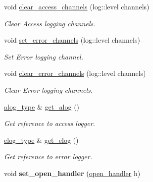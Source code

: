 \begin{DoxyCompactItemize}
void \mbox{\hyperlink{classwebsocketpp_1_1endpoint_a3fe357b3c6434273a9965eb52902575d}{clear\+\_\+access\+\_\+channels}} (log\+::level channels)
\begin{DoxyCompactList}\small\item\em Clear Access logging channels. \end{DoxyCompactList}\item 
void \mbox{\hyperlink{classwebsocketpp_1_1endpoint_a8292bcdca9344b57af1b0964ff7fc778}{set\+\_\+error\+\_\+channels}} (log\+::level channels)
\begin{DoxyCompactList}\small\item\em Set Error logging channel. \end{DoxyCompactList}\item 
void \mbox{\hyperlink{classwebsocketpp_1_1endpoint_a8cefa4fc37c0df4eb6ed0bcf04bb0da5}{clear\+\_\+error\+\_\+channels}} (log\+::level channels)
\begin{DoxyCompactList}\small\item\em Clear Error logging channels. \end{DoxyCompactList}\item 
\mbox{\hyperlink{classwebsocketpp_1_1endpoint_a1ca2ad5bfdd241a031746c3f158f4003}{alog\+\_\+type}} \& \mbox{\hyperlink{classwebsocketpp_1_1endpoint_a1607d873b9e764c02563162f03171326}{get\+\_\+alog}} ()
\begin{DoxyCompactList}\small\item\em Get reference to access logger. \end{DoxyCompactList}\item 
\mbox{\hyperlink{classwebsocketpp_1_1endpoint_a4ab98f4fed5b5b2740105eff732c7b1e}{elog\+\_\+type}} \& \mbox{\hyperlink{classwebsocketpp_1_1endpoint_a63ed630042ce9549dfc7d9513cb19678}{get\+\_\+elog}} ()
\begin{DoxyCompactList}\small\item\em Get reference to error logger. \end{DoxyCompactList}\item 
\mbox{\label{classwebsocketpp_1_1endpoint_a5753d9848aefc04ee91da401c0cc65b8}} 
void {\bfseries set\+\_\+open\+\_\+handler} (\mbox{\hyperlink{namespacewebsocketpp_a53c8b4ae59cf13b5f883b119bbd14d72}{open\+\_\+handler}} h)
\item 
\mbox{\label{classwebsocketpp_1_1endpoint_a8d7d95bebc154879655211e2b0b5e069}} 

\end{DoxyCompactItemize}
